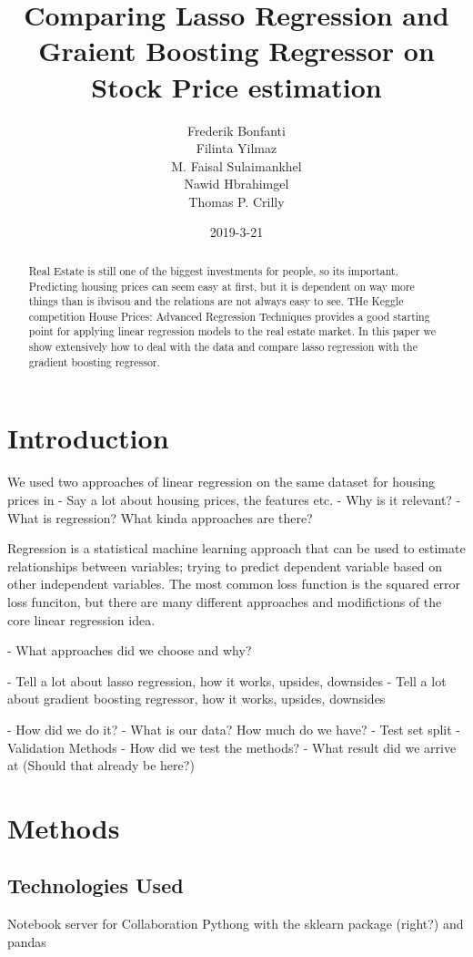 \documentclass{article}
\title{Comparing Lasso Regression and Graient Boosting Regressor on Stock Price estimation}
\date{2019-3-21}
\author{Frederik Bonfanti \\ Filinta Yilmaz \\ M. Faisal Sulaimankhel \\ Nawid Hbrahimgel \\ Thomas P. Crilly}
\begin{document}
\maketitle

\begin{abstract}
Real Estate is still one of the biggest investments for people, so its important.
Predicting housing prices can seem easy at first, but it is dependent on way more things than is ibvisou and the relations are not always easy to see.
THe Keggle competition House Prices: Advanced Regression Techniques provides a good starting point for applying linear regression models to the real estate market.
In this paper we show extensively how to deal with the data and compare lasso regression with the gradient boosting regressor.
\end{abstract}

\section{Introduction}
We used two approaches of linear regression on the same dataset for housing prices in 
 - Say a lot about housing prices, the features etc.
 - Why is it relevant?
 - What is regression? What kinda approaches are there?

Regression is a statistical machine learning approach that can be used to estimate relationships between variables; trying to predict dependent variable based on other independent variables. The most common loss function is the squared error loss funciton, but there are many different approaches and modifictions of the core linear regression idea.

 - What approaches did we choose and why?

   - Tell a lot about lasso regression, how it works, upsides, downsides
   - Tell a lot about gradient boosting regressor, how it works, upsides, downsides

 - How did we do it?
 - What is our data? How much do we have?
 - Test set split
 - Validation Methods
 - How did we test the methods?
 - What result did we arrive at (Should that already be here?)
\section{Methods}
\subsection{Technologies Used}
Notebook server for Collaboration
Pythong with the sklearn package (right?) and pandas
\end{document}

